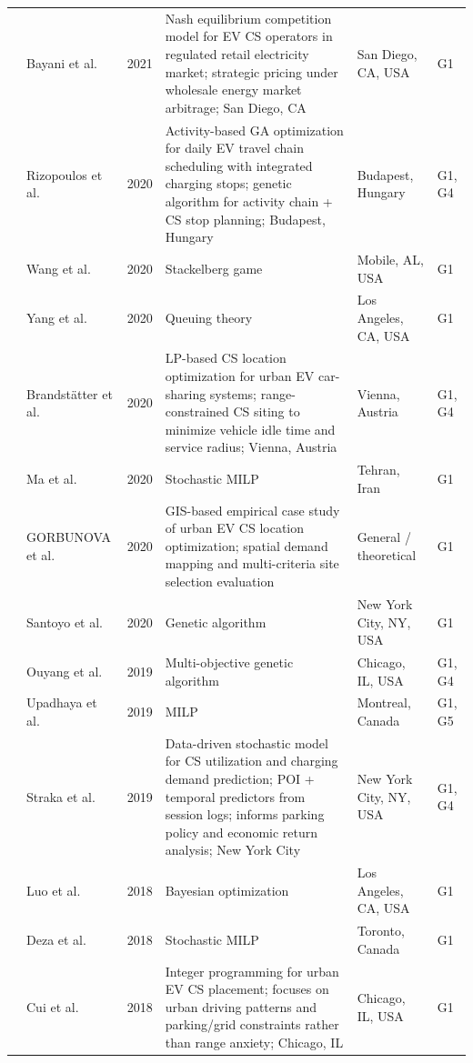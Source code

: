 \documentclass[letterpaper, 12pt, oneside, doublespacing]{Thesis}
\begin{document}
\begin{longtable}{L{0.9cm} L{2.2cm} L{0.8cm} L{3.3cm} L{2.5cm} L{1.5cm}}
\cite{strategic_competition_2021} & Bayani et al. & 2021 & Nash equilibrium competition model for EV CS operators in regulated retail electricity market; strategic pricing under wholesale energy market arbitrage; San Diego, CA & San Diego, CA, USA & G1 \\
\cite{a_method_2020} & Rizopoulos et al. & 2020 & Activity-based GA optimization for daily EV travel chain scheduling with integrated charging stops; genetic algorithm for activity chain + CS stop planning; Budapest, Hungary & Budapest, Hungary & G1, G4 \\
\cite{double-layer_game_2020} & Wang et al. & 2020 & Stackelberg game & Mobile, AL, USA & G1 \\
\cite{dynamic_modeling_2020} & Yang et al. & 2020 & Queuing theory & Los Angeles, CA, USA & G1 \\
\cite{location_of_2020} & Brandst\"atter et al. & 2020 & LP-based CS location optimization for urban EV car-sharing systems; range-constrained CS siting to minimize vehicle idle time and service radius; Vienna, Austria & Vienna, Austria & G1, G4 \\
\cite{optimal_fast_2020} & Ma et al. & 2020 & Stochastic MILP & Tehran, Iran & G1 \\
\cite{optimizing_the_2020} & GORBUNOVA et al. & 2020 & GIS-based empirical case study of urban EV CS location optimization; spatial demand mapping and multi-criteria site selection evaluation & General {\slash} theoretical & G1 \\
\cite{resource_aware_2020} & Santoyo et al. & 2020 & Genetic algorithm & New York City, NY, USA & G1 \\
\cite{a_method_2019} & Ouyang et al. & 2019 & Multi-objective genetic algorithm & Chicago, IL, USA & G1, G4 \\
\cite{optimal_decision_2019} & Upadhaya et al. & 2019 & MILP & Montreal, Canada & G1, G5 \\
\cite{predicting_popularity_2019} & Straka et al. & 2019 & Data-driven stochastic model for CS utilization and charging demand prediction; POI + temporal predictors from session logs; informs parking policy and economic return analysis; New York City & New York City, NY, USA & G1, G4 \\
\cite{a_consumer_2018} & Luo et al. & 2018 & Bayesian optimization & Los Angeles, CA, USA & G1 \\
\cite{charging_station_2018} & Deza et al. & 2018 & Stochastic MILP & Toronto, Canada & G1 \\
\cite{electric_vehicle_2018} & Cui et al. & 2018 & Integer programming for urban EV CS placement; focuses on urban driving patterns and parking/grid constraints rather than range anxiety; Chicago, IL & Chicago, IL, USA & G1 \\

\end{longtable}
\end{document}
